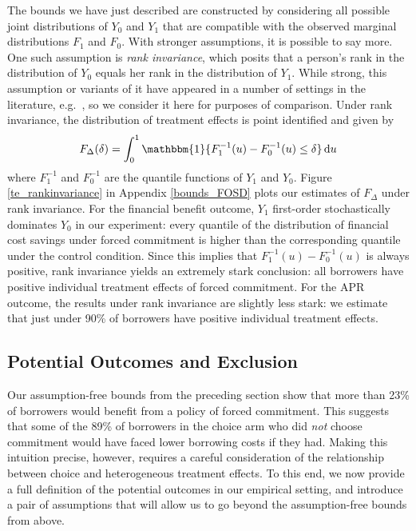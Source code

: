 \documentclass[11pt, a4paper]{article}
\begin{document}
The bounds we have just described are constructed by considering all possible joint distributions of $Y_0$ and $Y_1$ that are compatible with the observed marginal distributions $F_1$ and $F_0$. 
With stronger assumptions, it is possible to say more.
One such assumption is \emph{rank invariance}, which posits that a person's rank in the distribution of $Y_0$ equals her rank in the distribution of $Y_1$.
While strong, this assumption or variants of it have appeared in a number of settings in the literature, e.g.\ \cite{chernozhukov2005iv}, so we consider it here for purposes of comparison.
Under rank invariance, the distribution of treatment effects is point identified and given by 
\[
F_\Delta(\delta) = \int_0^1 \mathbbm{1}\{ F_1^{-1}(u) - F_0^{-1}(u)\leq \delta\}\,\mathrm{d}u 
\]
where $F_1^{-1}$ and $F_0^{-1}$ are the quantile functions of $Y_1$ and $Y_0$. Figure \ref{te_rankinvariance} in Appendix \ref{bounds_FOSD} plots our estimates of $F_\Delta$ under rank invariance.
For the financial benefit outcome, $Y_1$ first-order stochastically dominates $Y_0$ in our experiment: every quantile of the distribution of financial cost savings under forced commitment is higher than the corresponding quantile under the control condition. Since this implies that $F^{-1}_1(u) - F^{-1}_0(u)$ is always positive, rank invariance yields an extremely stark conclusion: all borrowers have positive individual treatment effects of forced commitment. 
For the APR outcome, the results under rank invariance are slightly less stark: we estimate that just under 90\% of borrowers have positive individual treatment effects. 

\subsection{Potential Outcomes and Exclusion}
\label{sec:potentialOutcomes}

Our assumption-free bounds from the preceding section show that more than 23\% of borrowers would benefit from a policy of forced commitment. 
This suggests that some of the 89\% of borrowers in the choice arm who did \emph{not} choose commitment would have faced lower borrowing costs if they had.
Making this intuition precise, however, requires a careful consideration of the relationship between choice and heterogeneous treatment effects. 
To this end, we now provide a full definition of the potential outcomes in our empirical setting, and introduce a pair of assumptions that will allow us to go beyond the assumption-free bounds from above.
\end{document}
